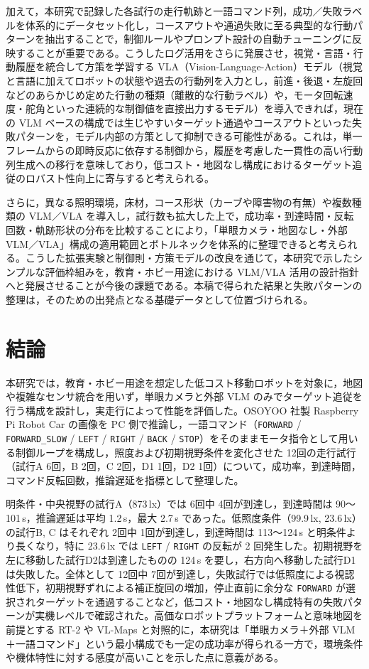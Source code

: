 \documentclass[a4paper,11pt]{ltjsreport}
\begin{document}
加えて，本研究で記録した各試行の走行軌跡と一語コマンド列，成功／失敗ラベルを体系的にデータセット化し，コースアウトや通過失敗に至る典型的な行動パターンを抽出することで，制御ルールやプロンプト設計の自動チューニングに反映することが重要である。こうしたログ活用をさらに発展させ，視覚・言語・行動履歴を統合して方策を学習する VLA（Vision-Language-Action）モデル（視覚と言語に加えてロボットの状態や過去の行動列を入力とし，前進・後退・左旋回などのあらかじめ定めた行動の種類（離散的な行動ラベル）や，モータ回転速度・舵角といった連続的な制御値を直接出力するモデル）を導入できれば，現在の VLM ベースの構成では生じやすいターゲット通過やコースアウトといった失敗パターンを，モデル内部の方策として抑制できる可能性がある。これは，単一フレームからの即時反応に依存する制御から，履歴を考慮した一貫性の高い行動列生成への移行を意味しており，低コスト・地図なし構成におけるターゲット追従のロバスト性向上に寄与すると考えられる。

さらに，異なる照明環境，床材，コース形状（カーブや障害物の有無）や複数種類の VLM／VLA を導入し，試行数も拡大した上で，成功率・到達時間・反転回数・軌跡形状の分布を比較することにより，「単眼カメラ・地図なし・外部 VLM／VLA」構成の適用範囲とボトルネックを体系的に整理できると考えられる。こうした拡張実験と制御則・方策モデルの改良を通じて，本研究で示したシンプルな評価枠組みを，教育・ホビー用途における VLM/VLA 活用の設計指針へと発展させることが今後の課題である。本稿で得られた結果と失敗パターンの整理は，そのための出発点となる基礎データとして位置づけられる。

\chapter{結論}
\label{chap:conclusion}
本研究では，教育・ホビー用途を想定した低コスト移動ロボットを対象に，地図や複雑なセンサ統合を用いず，単眼カメラと外部 VLM のみでターゲット追従を行う構成を設計し，実走行によって性能を評価した。OSOYOO 社製 Raspberry Pi Robot Car の画像を PC 側で推論し，一語コマンド（\texttt{FORWARD} / \texttt{FORWARD\_SLOW} / \texttt{LEFT} / \texttt{RIGHT} / \texttt{BACK} / \texttt{STOP}）をそのままモータ指令として用いる制御ループを構成し，照度および初期視野条件を変化させた 12回の走行試行（試行A 6回，B 2回，C 2回，D1 1回，D2 1回）について，成功率，到達時間，コマンド反転回数，推論遅延を指標として整理した。

明条件・中央視野の試行A（873\,lx）では 6回中 4回が到達し，到達時間は 90〜101\,s，推論遅延は平均 1.2\,s，最大 2.7\,s であった。低照度条件（99.9\,lx, 23.6\,lx）の試行B, C はそれぞれ 2回中 1回が到達し，到達時間は 113〜124\,s と明条件より長くなり，特に 23.6\,lx では \texttt{LEFT} / \texttt{RIGHT} の反転が 2 回発生した。初期視野を左に移動した試行D2は到達したものの 124\,s を要し，右方向へ移動した試行D1は失敗した。全体として 12回中 7回が到達し，失敗試行では低照度による視認性低下，初期視野ずれによる補正旋回の増加，停止直前に余分な \texttt{FORWARD} が選択されターゲットを通過することなど，低コスト・地図なし構成特有の失敗パターンが実機レベルで確認された。高価なロボットプラットフォームと意味地図を前提とする RT-2 や VL-Maps と対照的に，本研究は「単眼カメラ＋外部 VLM＋一語コマンド」という最小構成でも一定の成功率が得られる一方で，環境条件や機体特性に対する感度が高いことを示した点に意義がある。
\end{document}
